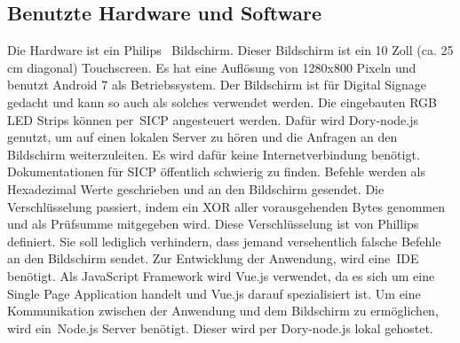 \subsection{Benutzte Hardware und Software}\label{subsec:benutzte-hardware-und-software}
\newline
Die Hardware ist ein Philips~\cite{10BDL4551T/00} Bildschirm.
Dieser Bildschirm ist ein 10 Zoll (ca. 25 cm diagonal) Touchscreen.
Es hat eine Auflösung von 1280x800 Pixeln und benutzt Android 7 als Betriebssystem.
Der Bildschirm ist für Digital Signage gedacht und kann so auch als solches verwendet werden.
Die eingebauten RGB LED Strips können per~\gls{SICP} angesteuert werden.
Dafür wird Dory-node.js genutzt, um auf einen lokalen Server zu hören und die Anfragen an den Bildschirm weiterzuleiten.
Es wird dafür keine Internetverbindung benötigt.
Dokumentationen für SICP öffentlich schwierig zu finden.
Befehle werden als Hexadezimal Werte geschrieben und an den Bildschirm gesendet.
Die Verschlüsselung passiert, indem ein XOR aller vorausgehenden Bytes genommen und als Prüfsumme mitgegeben wird.
Diese Verschlüsselung ist von Phillips definiert.
Sie soll lediglich verhindern, dass jemand versehentlich falsche Befehle an den Bildschirm sendet.
\newline
\newline
{}
Zur Entwicklung der Anwendung, wird eine~\gls{IDE} benötigt.
Als JavaScript Framework wird Vue.js verwendet, da es sich um eine Single Page Application handelt und Vue.js darauf spezialisiert ist.
\newline
{}
Um eine Kommunikation zwischen der Anwendung und dem Bildschirm zu ermöglichen, wird ein~\gls{Node.js Server} benötigt.
Dieser wird per Dory-node.js lokal gehostet.
